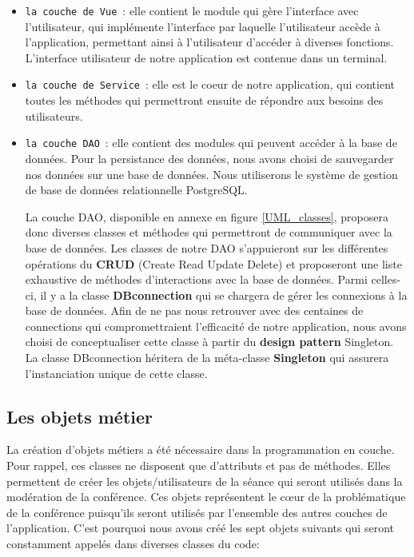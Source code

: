 \documentclass[11pt]{article}
\begin{document}
\begin{itemize}
    \item \texttt{la couche de Vue}~: elle contient le module qui gère l'interface avec l'utilisateur, qui implémente l'interface par laquelle l'utilisateur accède à l'application, permettant ainsi à l'utilisateur d'accéder à diverses fonctions. L'interface utilisateur de notre application est contenue dans un terminal.
    \item \texttt{la couche de Service}~:  elle est le coeur de notre application, qui contient toutes les méthodes qui permettront ensuite de répondre aux besoins des utilisateurs.
    \item \texttt{la couche DAO}~:  elle contient des modules qui peuvent accéder à la base de données. Pour la persistance des données, nous avons choisi de sauvegarder nos données sur une base de données. Nous utiliserons le système de gestion de base de données relationnelle PostgreSQL.

    La couche DAO, disponible en annexe en figure \ref{UML_classes}, proposera donc diverses classes et méthodes qui permettront de communiquer avec la base de données. Les classes de notre DAO s'appuieront sur les différentes opérations du \textbf{CRUD} (Create Read Update Delete) et proposeront une liste exhaustive de méthodes d'interactions avec la base de données. Parmi celles-ci, il y a la classe \textbf{DBconnection} qui se chargera de gérer les connexions à la base de données. Afin de ne pas nous retrouver avec des centaines de connections qui compromettraient l'efficacité de notre application, nous avons choisi de conceptualiser cette classe à partir du \textbf{design pattern} Singleton. La classe DBconnection héritera de la méta-classe \textbf{Singleton} qui assurera l'instanciation unique de cette classe.
\end{itemize}


\subsection{Les objets métier}

La création d’objets métiers a été nécessaire dans la programmation en couche. Pour rappel, ces classes ne disposent que d’attributs et pas de méthodes. Elles permettent de créer les objets/utilisateurs de la séance qui seront utilisés dans la modération de la conférence. Ces objets représentent le cœur de la problématique de la conférence puisqu’ils seront utilisés par l’ensemble des autres couches de l’application. C’est pourquoi nous avons créé les sept objets suivants qui seront constamment appelés dans diverses classes du code:
\end{document}
